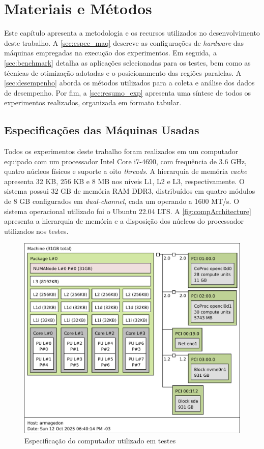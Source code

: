 \chapter{Materiais e Métodos}\label{cap:metodologia}

Este capítulo apresenta a metodologia e os recursos utilizados no desenvolvimento deste trabalho. A \autoref{sec:espec_maq} descreve as configurações de \textit{hardware} das máquinas empregadas na execução dos experimentos. Em seguida, a \autoref{sec:benchmark} detalha as aplicações selecionadas para os testes, bem como as técnicas de otimização adotadas e o posicionamento das regiões paralelas. A \autoref{sec:desempenho} aborda os métodos utilizados para a coleta e análise dos dados de desempenho. Por fim, a \autoref{sec:resumo_exp} apresenta uma síntese de todos os experimentos realizados, organizada em formato tabular.

\section{Especificações das Máquinas Usadas}\label{sec:espec_maq}

Todos os experimentos deste trabalho foram realizados em um computador equipado com um processador Intel Core i7-4690, com frequência de 3.6 GHz, quatro núcleos físicos e suporte a oito \textit{threads}. A hierarquia de memória \textit{cache} apresenta 32 KB, 256 KB e 8 MB nos níveis L1, L2 e L3, respectivamente. O sistema possui 32 GB de memória RAM DDR3, distribuídos em quatro módulos de 8 GB configurados em \textit{dual-channel}, cada um operando a 1600 MT/s. O sistema operacional utilizado foi o Ubuntu 22.04 LTS. A \autoref{fig:compArchitecture} apresenta a hierarquia de memória e a disposição dos núcleos do processador utilizados nos testes.

\begin{figure}[htb]
	\caption{Especificação do computador utilizado em testes}
	\label{fig:compArchitecture}
	\includegraphics[scale=0.7]{figuras/architecture.pdf}
	\fonte{}
\end{figure}

